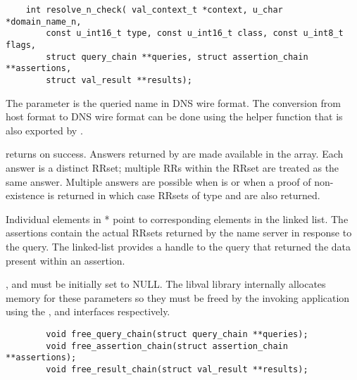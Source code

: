 \begin{verbatim}
    int resolve_n_check( val_context_t *context, u_char *domain_name_n,
        const u_int16_t type, const u_int16_t class, const u_int8_t flags,
        struct query_chain **queries, struct assertion_chain **assertions,
        struct val_result **results);
\end{verbatim}
                                                                                                                             
The  parameter is the queried name in DNS wire format.
The conversion from host format to DNS wire format can be done using
the   helper function that is also exported by
.
                                                                                                                             
 returns  on success.
Answers returned by  are made available in the
 array. Each answer is a distinct RRset; multiple RRs within
the RRset are treated as the same answer. Multiple answers are possible
when  is  or when a proof of non-existence is returned
in which case RRsets of type  and  are also
returned.

Individual elements in * point to corresponding elements in the
 linked list. The assertions contain the actual RRsets
returned by the name server in response to the query. The 
linked-list provides a handle to the query that returned the data
present within an assertion.
                                                                                                                             
,  and  must be initially set to NULL.
The libval library internally allocates memory for these parameters so
they must be freed by the invoking application using the
,  and 
interfaces respectively.

\begin{verbatim}
        void free_query_chain(struct query_chain **queries);
        void free_assertion_chain(struct assertion_chain **assertions);
        void free_result_chain(struct val_result **results);
\end{verbatim}

